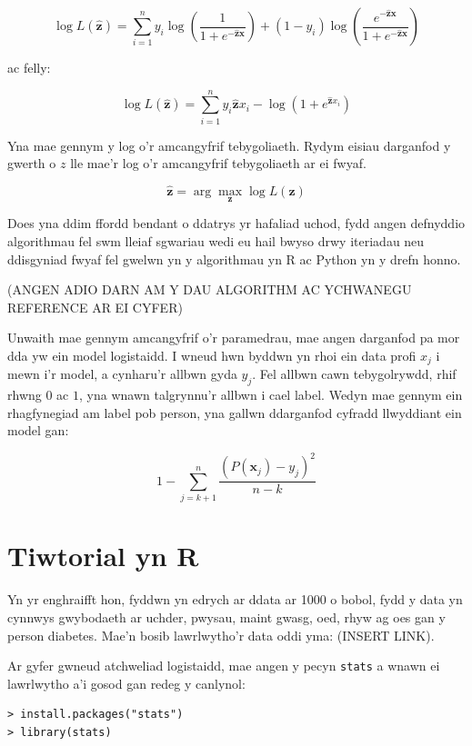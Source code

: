 $$ \log L(\hat{\mathbf{z}}) = \sum_{i=1}^{n} y_{i} \log \left(\frac{1}{1 + e^{-\hat{\mathbf{z}}\mathbf{x}}} \right) + (1 - y_i) \log \left(\frac{e^{-\hat{\mathbf{z}}\mathbf{x}}}{1 + e^{-\hat{\mathbf{z}}\mathbf{x}}} \right) $$

ac felly:

$$ \log L(\hat{\mathbf{z}}) = \sum_{i=1}^{n} y_i \hat{\mathbf{z}} x_i - \log(1 + e^{\hat{\mathbf{z}} x_i}) $$

Yna mae gennym y log o'r amcangyfrif tebygoliaeth. Rydym eisiau darganfod y gwerth o $z$ lle mae'r log o'r amcangyfrif tebygoliaeth ar ei fwyaf.

$$ \hat{\mathbf{z}} = \arg \max_{\mathbf{z}} \log L(\mathbf{z})  $$

Does yna ddim ffordd bendant o ddatrys yr hafaliad uchod, fydd angen defnyddio algorithmau fel swm lleiaf sgwariau wedi eu hail bwyso drwy iteriadau neu ddisgyniad fwyaf fel gwelwn yn y algorithmau yn R ac Python yn y drefn honno. 

(ANGEN ADIO DARN AM Y DAU ALGORITHM AC YCHWANEGU REFERENCE AR EI CYFER)

Unwaith mae gennym amcangyfrif o'r paramedrau, mae angen darganfod pa mor dda yw ein model logistaidd. I wneud hwn byddwn yn rhoi ein data profi $x_j$ i mewn i'r model, a cynharu'r allbwn gyda $y_j$. Fel allbwn cawn tebygolrywdd, rhif rhwng $0$ ac $1$, yna wnawn talgrynnu'r allbwn i cael label. Wedyn mae gennym ein rhagfynegiad am label pob person, yna gallwn ddarganfod cyfradd llwyddiant ein model gan:

$$ 1 - \sum_{j = k+1}^{n} \frac{(P(\mathbf{x}_j) - y_j)^{2}}{n - k} $$


\section{Tiwtorial yn R}

Yn yr enghraifft hon, fyddwn yn edrych ar ddata ar 1000 o bobol, fydd y data yn cynnwys gwybodaeth ar uchder, pwysau, maint gwasg, oed, rhyw ag oes gan y person diabetes. Mae'n bosib lawrlwytho'r data oddi yma: (INSERT LINK). 

Ar gyfer gwneud atchweliad logistaidd, mae angen y pecyn \texttt{stats} a wnawn ei lawrlwytho a'i gosod gan redeg y canlynol:

\begin{verbatim}
> install.packages("stats")
> library(stats)
\end{verbatim}

